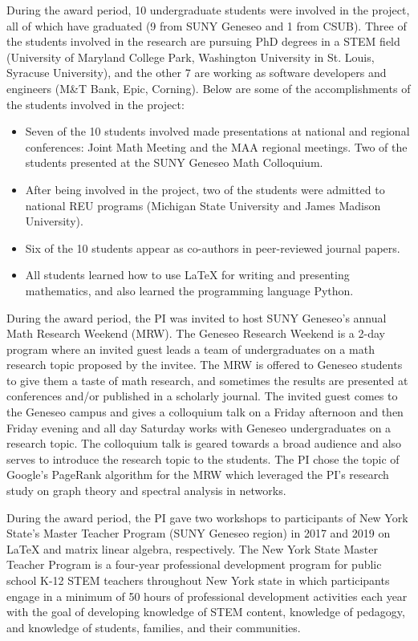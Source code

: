 \documentclass[11pt]{article}
\begin{document}
During the award period, 10 undergraduate students were involved in the project, all of which have graduated (9 from SUNY Geneseo and 1 from CSUB). Three of the students involved in the research are pursuing PhD degrees in a STEM field (University of Maryland College Park, Washington University in St. Louis, Syracuse University), and the other 7 are working as software developers and engineers (M\&T Bank, Epic, Corning).  Below are some of the accomplishments of the students involved in the project:
\begin{itemize}
\item Seven of the 10 students involved made presentations at national and regional conferences: Joint Math Meeting and the MAA regional meetings. Two of the students presented at the SUNY Geneseo Math Colloquium.
\item After being involved in the project, two of the students were admitted to national REU programs (Michigan State University and James Madison University).
\item Six of the 10 students appear as co-authors in peer-reviewed journal papers.
\item All students learned how to use LaTeX for writing and presenting mathematics, and also learned the programming language Python.
\end{itemize}

During the award period, the PI was invited to host SUNY Geneseo's annual Math Research Weekend (MRW). The Geneseo Research Weekend is a 2-day program where an invited guest leads a team of  undergraduates on a math research topic proposed by the invitee. The MRW is offered to Geneseo students to give them a taste of math research, and sometimes the results are presented at conferences and/or published in a scholarly journal. The invited guest comes to the Geneseo campus and gives a colloquium talk on a Friday afternoon and then Friday evening and all day Saturday works with Geneseo undergraduates on a research topic. The colloquium talk is geared towards a broad audience and also serves to introduce the research topic to the students. The PI chose the topic of Google's PageRank algorithm for the MRW which leveraged the PI's research study on graph theory and spectral analysis in networks.

During the award period, the PI gave two workshops to participants of New York State's Master Teacher Program (SUNY Geneseo region) in 2017 and 2019 on LaTeX and matrix linear algebra, respectively.  The New York State Master Teacher Program is a four-year professional development program for public school K-12 STEM teachers throughout New York state in which participants engage in a minimum of 50 hours of professional development activities each year with the goal of developing knowledge of STEM content, knowledge of pedagogy, and knowledge of students, families, and their communities.
\end{document}
